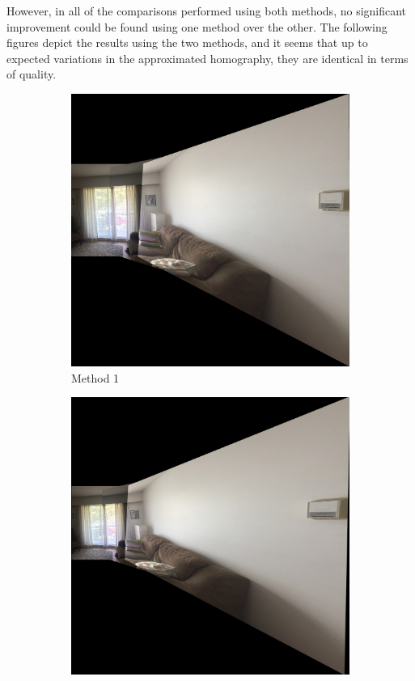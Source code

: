 \documentclass[]{article}
\begin{document}
However, in all of the comparisons performed using both methods, no significant improvement could be found using one method over the other. The following figures depict the results using the two methods, and it seems that up to expected variations in the approximated homography, they are identical in terms of quality.

\vspace{100mm}

\begin{figure}[!h]
	\begin{subfigure}[!h]{0.5\textwidth}
		\includegraphics[scale=0.091]{results/SIFT_indifference/method1/16}
		\centering
		\caption{Method 1}
	\end{subfigure}%
	\hfill
	\begin{subfigure}[!h]{0.5\textwidth}
		\includegraphics[scale=0.095]{results/SIFT_indifference/method2/8}

\end{subfigure}
\end{figure}
\end{document}
